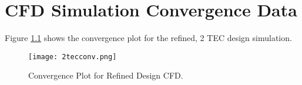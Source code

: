 \appendix

\chapter{CFD Simulation Convergence Data}
\label{cha:CFDconverg}

Figure \ref{fig:2tecconv} shows the convergence plot for the refined, 2 TEC design simulation.

\begin{figure}[!htb]
	\centering
	\texttt{[image: 2tecconv.png]}
	\caption[Convergence Plot for Refined Design CFD.]{Convergence Plot for Refined Design CFD.}
	\label{fig:2tecconv}
\end{figure} 
\FloatBarrier


